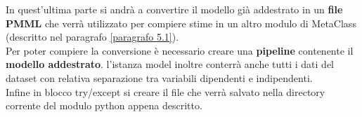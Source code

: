 In quest'ultima parte si andrà a convertire il modello già addestrato in un \textbf{file PMML} che verrà utilizzato per compiere stime in un altro modulo di MetaClass (descritto nel paragrafo \ref{paragrafo 5.1}). \vspace{1ex} \\
Per poter compiere la conversione è necessario creare una \textbf{pipeline} contenente il \textbf{modello addestrato}. l'istanza model inoltre conterrà anche tutti i dati del dataset con relativa separazione tra variabili dipendenti e indipendenti. \\
Infine in blocco try/except si creare il file che verrà salvato nella directory corrente del modulo python appena descritto.





